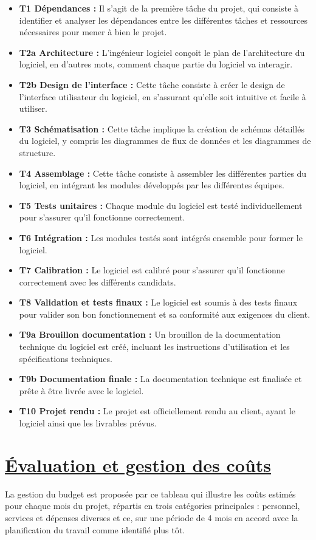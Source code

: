 \documentclass[11pt]{article}
\begin{document}
\begin{itemize}
  \item \textbf{T1 Dépendances :} Il s'agit de la première tâche du projet, qui consiste à identifier et analyser les dépendances entre les différentes tâches et ressources nécessaires pour mener à bien le projet.
  \item \textbf{T2a Architecture :} L'ingénieur logiciel conçoit le plan de l'architecture du logiciel, en d'autres mots, comment chaque partie du logiciel va interagir.
  \item \textbf{T2b Design de l'interface :} Cette tâche consiste à créer le design de l'interface utilisateur du logiciel, en s'assurant qu'elle soit intuitive et facile à utiliser.
  \item \textbf{T3 Schématisation :} Cette tâche implique la création de schémas détaillés du logiciel, y compris les diagrammes de flux de données et les diagrammes de structure.
  \item \textbf{T4 Assemblage :} Cette tâche consiste à assembler les différentes parties du logiciel, en intégrant les modules développés par les différentes équipes.
  \item \textbf{T5 Tests unitaires :} Chaque module du logiciel est testé individuellement pour s'assurer qu'il fonctionne correctement.
  \item \textbf{T6 Intégration :} Les modules testés sont intégrés ensemble pour former le logiciel.
  \item \textbf{T7 Calibration :} Le logiciel est calibré pour s'assurer qu'il fonctionne correctement avec les différents candidats.
  \item \textbf{T8 Validation et tests finaux :} Le logiciel est soumis à des tests finaux pour valider son bon fonctionnement et sa conformité aux exigences du client.
  \item \textbf{T9a Brouillon documentation :} Un brouillon de la documentation technique du logiciel est créé, incluant les instructions d'utilisation et les spécifications techniques.
  \item \textbf{T9b Documentation finale :} La documentation technique est finalisée et prête à être livrée avec le logiciel.
  \item \textbf{T10 Projet rendu :} Le projet est officiellement rendu au client, ayant le logiciel ainsi que les livrables prévus.
\end{itemize}


\newpage

\section{\underline{Évaluation et gestion des coûts}}
La gestion du budget est proposée par ce tableau qui illustre les coûts estimés pour chaque mois du projet, répartis en trois catégories principales : personnel, services et dépenses diverses et ce, sur une période de 4 mois en accord avec la planification du travail comme identifié plus tôt.
\end{document}
